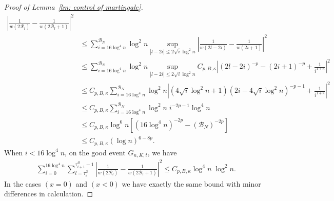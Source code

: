 \documentclass[EJP]{ejpecp} %
\begin{document}
\begin{proof}[Proof of Lemma~\ref{lm: control of martingale}]
\begin{align*}
		\left| \frac{1}{w(2 \mathscr{R}_l)} - \frac{1}{w\left( 2 \mathscr{B}_l + 1 \right) } \right|^2 \\
		&\leq \sum_{i = 16 \log^4 n}^{\mathscr{B}_N} \log^2 n \sup_{|l - 2 i| \le 2 \sqrt{i} \log^2 n} 
		\left| \frac{1}{w(2 l - 2 i)} - \frac{1}{w\left(2 i + 1 \right) } \right|^2 \\
		&\leq \sum_{i = 16 \log^4 n}^{\mathscr{B}_N} \log^2 n \sup_{|l - 2 i| \le 2 \sqrt{i} \log^2 n} 
		C_{p, B, \kappa} \left| (2 l - 2 i)^{-p} - (2 i + 1)^{-p} + \frac{1}{i^{1 + \kappa}} \right|^2 \\
		&\leq C_{p, B, \kappa} \sum_{i = 16 \log^4 n}^{\mathscr{B}_N} \log^2 n  
		 \left| (4 \sqrt{i} \log^2 n + 1)(2 i - 4 \sqrt{i} \log^2 n)^{- p - 1} + \frac{1}{i^{1 + \kappa}} \right|^2 \\
		&\leq C_{p, B, \kappa} \sum_{i = 16 \log^4 n}^{\mathscr{B}_N} \log^2 n \; i^{- 2 p - 1} \log^4 n \\
		&\leq C_{p, B, \kappa} \log^6 n 
			\left[(16 \log^4 n)^{- 2 p} - (\mathscr{B}_N)^{-2p}\right] \\
		&\leq C_{p, B, \kappa} (\log n)^{6 - 8 p}
		.
	\end{align*}
	When $i < 16 \log^4 n$, on the good event $G_{n, K, t}$, we have
	\begin{align*}
		&\sum_{i = 0}^{16 \log^4 n} \sum_{l = \tau_i^{\mathscr{B}}}^{\tau_{i+1}^{\mathscr{B}}-1} 
		\left| \frac{1}{w(2 \mathscr{R}_l)} - \frac{1}{w\left( 2 \mathscr{B}_l + 1 \right) } \right|^2 
		\leq C_{p, B, \kappa} \log^4 n \; \log^2 n
		.
	\end{align*}
	In the cases $(x=0)$ and $(x < 0)$ we have exactly the same bound with minor differences in calculation.


\end{proof}
\end{document}
